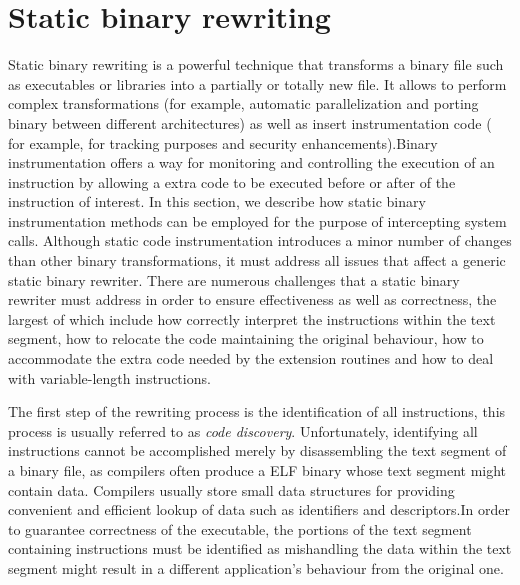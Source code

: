 \section{Static binary rewriting}
\label{static_rewriting}

Static binary rewriting  is a powerful technique that transforms a binary file such as executables or libraries into a partially or totally new file. It allows to perform complex transformations (for example, automatic parallelization and porting binary between different architectures) as well as insert instrumentation code ( for example, for tracking purposes and security enhancements).Binary instrumentation offers a way for monitoring and controlling the execution of an instruction by allowing a extra code to be executed before or after of the instruction of interest. In this section, we describe how static binary instrumentation methods can be employed for the purpose of intercepting system calls. 
Although static code instrumentation introduces a minor number of changes than other  binary transformations, it must address all issues that affect a generic static binary rewriter. There are numerous challenges that a static binary rewriter must address in order to ensure effectiveness as well as correctness, the largest of which include how correctly interpret the instructions within the text segment, how to relocate the code maintaining the original behaviour,  how to accommodate the extra code needed by the extension routines and how to deal with variable-length instructions. 

The first step of the rewriting process is the identification of all instructions, this process is usually referred to as \emph{code discovery}. Unfortunately, identifying all instructions cannot be accomplished merely by disassembling the text segment of a binary file, as compilers often produce a ELF binary whose text segment might contain data. Compilers usually store small data structures for providing convenient and efficient lookup of data such as identifiers and descriptors.In order to guarantee correctness of the executable, the portions of the text segment containing instructions must be identified as mishandling the data within the text segment might result in a different application's behaviour from the original one.

